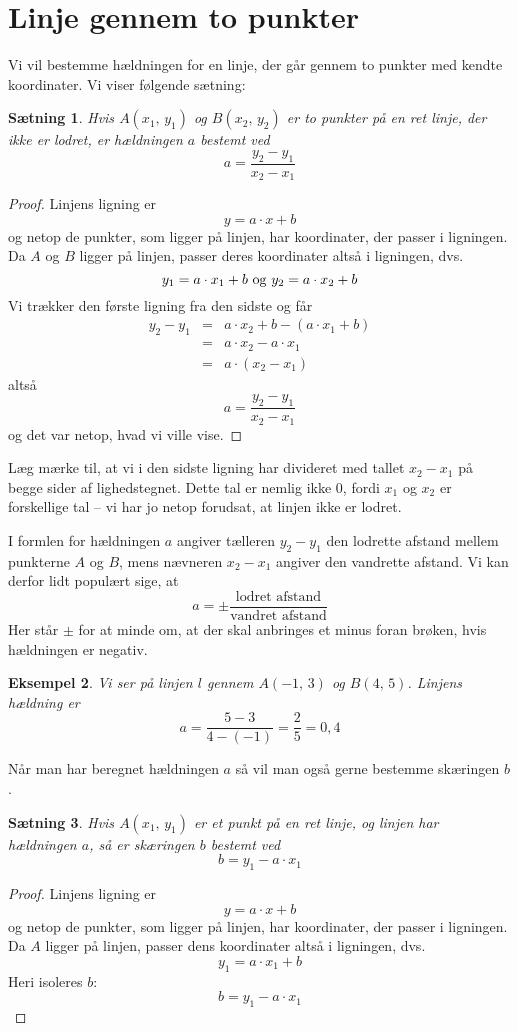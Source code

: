 \documentclass[12pt,oneside,a4paper]{article}
\newcommand{\bas}{\begin{eqnarray*}}
\newcommand{\eas}{\end{eqnarray*}}
\newtheorem{thm}{Sætning}[section]
\newtheorem{eks}[thm]{Eksempel}
\begin{document}
\section{Linje gennem to punkter}
Vi vil bestemme hældningen for en linje, der går gennem
to punkter med kendte koordinater. Vi viser følgende sætning:
\begin{thm}
    Hvis $A(x_1,\,y_1)$ og $B(x_2,\,y_2)$ er to punkter på en ret linje, der ikke
    er lodret, er hældningen $a$ bestemt ved
    $$
    a = \frac{y_2-y_1}{x_2-x_1}
    $$
\end{thm}
\begin{proof}
    Linjens ligning er 
    $$
    y = a\cdot x + b
    $$
    og netop de punkter, som ligger på linjen, har koordinater, der passer i
    ligningen.  Da $A$ og $B$ ligger på linjen, passer deres koordinater altså
    i ligningen, dvs.
    $$
    y_1 = a\cdot x_1 + b \,\, {\rm og} \,\, y_2 = a\cdot x_2 + b 
    $$
    Vi trækker den første ligning fra den sidste og får
    \bas
    y_2 - y_1 &=& a\cdot x_2 + b - (a\cdot x_1 + b) \\
              &=& a\cdot x_2 - a\cdot x_1 \\
              &=& a\cdot \left(x_2-x_1\right) 
    \eas
    altså
    $$
    a = \frac{y_2-y_1}{x_2-x_1}
    $$
    og det var netop, hvad vi ville vise.
\end{proof}

Læg mærke til, at vi i den sidste ligning har divideret med tallet $x_2-x_1$ på
begge sider af lighedstegnet. Dette tal er nemlig ikke $0$, fordi $x_1$ og
$x_2$ er forskellige tal -- vi har jo netop forudsat, at linjen ikke er lodret.

I formlen for hældningen $a$ angiver tælleren $y_2-y_1$ den lodrette afstand
mellem punkterne $A$ og $B$, mens nævneren $x_2-x_1$ angiver den vandrette
afstand. Vi kan derfor lidt populært sige, at
$$
a = \pm \frac{\mbox{lodret afstand}}{\mbox{vandret afstand}}
$$
Her står $\pm$ for at minde om, at der skal anbringes et minus foran brøken,
hvis hældningen er negativ.
\begin{eks}
    Vi ser på linjen $l$ gennem $A(-1,\,3)$ og $B(4,\,5)$.
    Linjens hældning er
    $$
    a = \frac{5-3}{4-(-1)} = \frac{2}{5} = 0,4
    $$
\end{eks}

Når man har beregnet hældningen $a$ så vil man også gerne bestemme skæringen
$b$.
\begin{thm}
    Hvis $A(x_1,\,y_1)$ er et punkt på en ret linje, og linjen har hældningen
    $a$, så er skæringen $b$ bestemt ved
    $$
    b = y_1 - a\cdot x_1
    $$
\end{thm}
\begin{proof}
    Linjens ligning er 
    $$
    y = a\cdot x + b
    $$
    og netop de punkter, som ligger på linjen, har koordinater, der passer i
    ligningen.  Da $A$ ligger på linjen, passer dens koordinater altså i
    ligningen, dvs.
    $$
    y_1 = a\cdot x_1 + b 
    $$
    Heri isoleres $b$:
    $$
    b = y_1 - a\cdot x_1
    $$
\end{proof}
\end{document}
